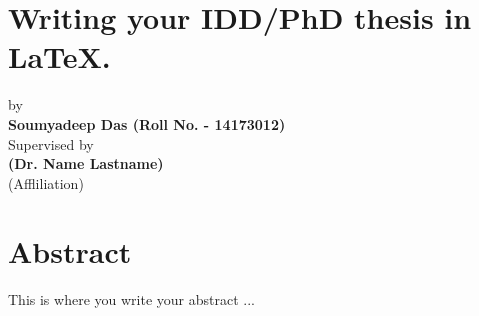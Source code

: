 \documentclass[12pt,a4paper]{article}
\begin{document}
	\section*{ \centering \Large Writing your IDD/PhD thesis in \LaTeX.}
	{\centering
	by\\
	\textbf{Soumyadeep Das (Roll No. - 14173012)}\\
	Supervised by\\
	\textbf{(Dr. Name Lastname)}\\
	(Affliliation)

	}
	
	\doublespacing
	\section*{Abstract}
	\hspace*{1cm} This is where you write your abstract ...
\end{document}
